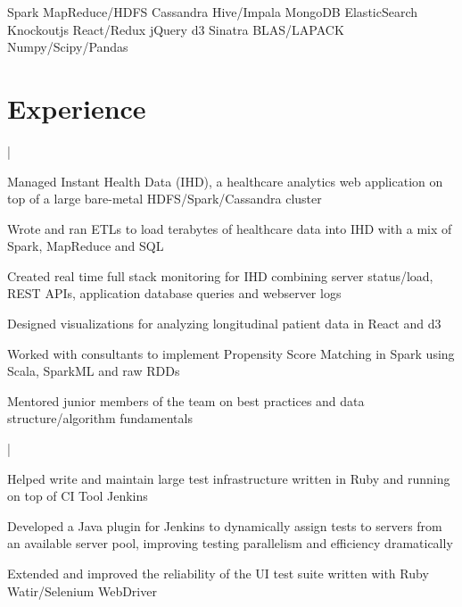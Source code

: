 \documentclass[]{deedy-resume-openfont}
\begin{document}
 \descript{}
\vspace{1pt}
Spark \textbullet{} MapReduce/HDFS \textbullet{} Cassandra \textbullet{} Hive/Impala \textbullet{} MongoDB \textbullet{} ElasticSearch \\
Knockoutjs \textbullet{} React/Redux \textbullet{} jQuery \textbullet{} d3 \textbullet{} Sinatra \textbullet{} BLAS/LAPACK \textbullet{} Numpy/Scipy/Pandas
\sectionsep


\vspace{-5pt}
\section{Experience}

|
\begin{tightemize}
\item Managed Instant Health Data (IHD), a healthcare analytics web application on top of a large bare-metal HDFS/Spark/Cassandra cluster
\item Wrote and ran ETLs to load terabytes of healthcare data into IHD with a mix of Spark, MapReduce and SQL
\item Created real time full stack monitoring for IHD combining server status/load, REST APIs, application database queries and webserver logs
\item Designed visualizations for analyzing longitudinal patient data in React and d3
\item Worked with consultants to implement Propensity Score Matching in Spark using Scala, SparkML and raw RDDs
\item Mentored junior members of the team on best practices and data structure/algorithm fundamentals
\end{tightemize}
\sectionsep

|
\begin{tightemize}
\item Helped write and maintain large test infrastructure written in Ruby and running on top of CI Tool Jenkins
\item Developed a Java plugin for Jenkins to dynamically assign tests to servers from an available server pool, improving testing parallelism and efficiency dramatically
\item Extended and improved the reliability of the UI test suite written with Ruby Watir/Selenium WebDriver
\end{tightemize}
\sectionsep
\end{document}
